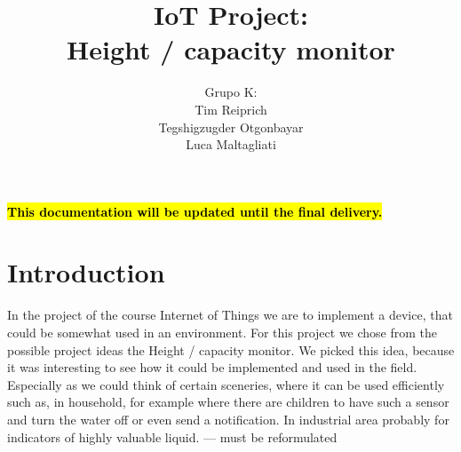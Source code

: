 \documentclass{article}
\title{IoT Project: \\Height / capacity monitor}
\author{Grupo K: \\ Tim Reiprich \\ Tegshigzugder Otgonbayar \\ Luca Maltagliati}
\begin{document}
\pagestyle{plain}

\maketitle


\newpage

\textcolor{red}{\textbf{\hl{This documentation will be updated until the final delivery.}}}

\tableofcontents %
\newpage




\section{Introduction}

In the project of the course Internet of Things we are to implement a device, that could be somewhat used in an environment. For this project we chose from the possible project ideas the Height / capacity monitor. We picked this idea, because it was interesting to see how it could be implemented and used in the field. Especially as we could think of certain sceneries, where it can be used efficiently such as, in household, for example where there are children to have such a sensor and turn the water off or even send a notification. In industrial area probably for indicators of highly valuable liquid. --- must be reformulated
\end{document}
